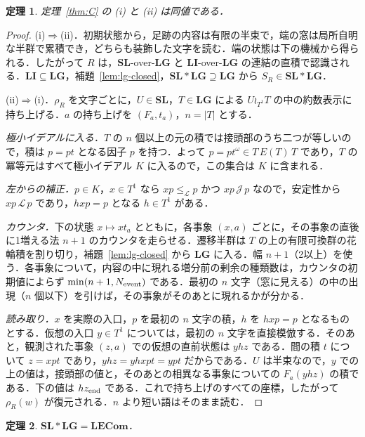 \documentclass[11pt,a4paper]{ltjsarticle}
\numberwithin{equation}{section}
\theoremstyle{plain}
\newtheorem{theorem}{定理}[section]
\theoremstyle{definition}
\theoremstyle{remark}
\theoremstyle{plain}
\newcommand{\LG}{\mathbf{LG}}
\newcommand{\LI}{\mathbf{LI}}
\newcommand{\SL}{\mathbf{SL}}
\newcommand{\LECom}{\mathbf{L}\mathbf{ECom}}
\begin{document}
\begin{theorem}
\label{thm:recovery}
定理~\ref{thm:C} の (i) と (ii) は同値である．
\end{theorem}

\begin{proof}
(i)$\Rightarrow$(ii)．初期状態から，足跡の内容は有限の半束で，端の窓は局所自明な半群で累積でき，どちらも装飾した文字を読む．端の状態は下の機械から得られる．したがって $R$ は，$\SL$-over-$\LG$ と $\LI$-over-$\LG$ の連結の直積で認識される．$\LI\subseteq\LG$，補題~\ref{lem:lg-closed}，$\SL*\LG\supseteq\LG$ から $S_R\in\SL*\LG$．

(ii)$\Rightarrow$(i)．$\rho_R$ を文字ごとに，$U\in\SL$，$T\in\LG$ による $U\wr_{T^1}T$ の中の約数表示に持ち上げる．$a$ の持ち上げを $(F_a,t_a)$，$n=|T|$ とする．

\emph{極小イデアルに入る．}$T$ の $n$ 個以上の元の積では接頭部のうち二つが等しいので，積は $p=pt$ となる因子 $p$ を持つ．よって $p=pt^\omega\in T\,E(T)\,T$ であり，$T$ の冪等元はすべて極小イデアル $K$ に入るので，この集合は $K$ に含まれる．

\emph{左からの補正．}$p\in K$，$x\in T^1$ なら $xp\le_{\mathcal L}p$ かつ $xp\,\mathcal J\,p$ なので，安定性から $xp\,\mathcal L\,p$ であり，$hxp=p$ となる $h\in T^1$ がある．

\emph{カウンタ．}下の状態 $x\mapsto xt_a$ とともに，各事象 $(x,a)$ ごとに，その事象の直後に1増える法 $n+1$ のカウンタを走らせる．遷移半群は $T$ の上の有限可換群の花輪積を割り切り，補題~\ref{lem:lg-closed} から $\LG$ に入る．幅 $n+1$（2以上）を使う．各事象について，内容の中に現れる増分前の剰余の種類数は，カウンタの初期値によらず $\min(n+1,N_{\rm event})$ である．最初の $n$ 文字（窓に見える）の中の出現（$n$ 個以下）を引けば，その事象がそのあとに現れるかが分かる．

\emph{読み取り．}$x$ を実際の入口，$p$ を最初の $n$ 文字の積，$h$ を $hxp=p$ となるものとする．仮想の入口 $y\in T^1$ については，最初の $n$ 文字を直接模倣する．そのあと，観測された事象 $(z,a)$ での仮想の直前状態は $yhz$ である．間の積 $t$ について $z=xpt$ であり，$yhz=yhxpt=ypt$ だからである．$U$ は半束なので，$y$ での上の値は，接頭部の値と，そのあとの相異なる事象についての $F_a(yhz)$ の積である．下の値は $hz_{\rm end}$ である．これで持ち上げのすべての座標，したがって $\rho_R(w)$ が復元される．$n$ より短い語はそのまま読む．
\end{proof}

\begin{theorem}
\label{thm:SLLG-LECom}
$\SL*\LG=\LECom$．
\end{theorem}
\end{document}

